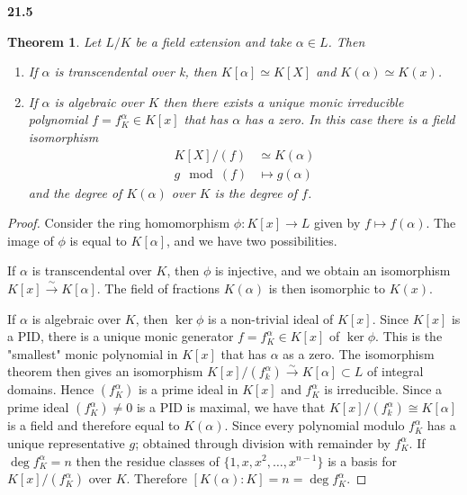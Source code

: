 \documentclass{article}
\theoremstyle{plain}
\newtheorem*{theorem*}{Theorem}
\theoremstyle{remark}
\newenvironment{colbox}[1]
    {\newcommand\colboxcolor{B6D0DE}%
    \begin{lrbox}{\selvestebox}%
    \begin{minipage}{\dimexpr\columnwidth-2\fboxsep\relax}\textbf{#1}}
    {\vspace{0.5em}\end{minipage}\end{lrbox}%
    \begin{center}
    \colorbox[HTML]{\colboxcolor}{\usebox{\selvestebox}}
    \end{center}}
\begin{document}
    \begin{colbox}{21.5}
        \begin{theorem*}
            Let $L/K$ be a field extension and take $\alpha\in L$. Then
            \begin{enumerate}
                \item If $\alpha$ is transcendental over k, then $K[\alpha]\simeq K[X]$ and $K(\alpha)\simeq K(x)$.
                \item If $\alpha$ is algebraic over $K$ then there exists a unique monic irreducible polynomial $f=f_K^\alpha\in K[x]$ that has $\alpha$ has a zero.
                    In this case there is a field isomorphism
                    \begin{align*}
                        K[X]/(f)&\simeq K(\alpha)\\
                        g\mod (f)&\mapsto g(\alpha)
                    \end{align*}
                    and the degree of $K(\alpha)$ over $K$ is the degree of $f$.
            \end{enumerate}
        \end{theorem*}
    \end{colbox}
    \begin{proof}
        Consider the ring homomorphism $\phi:K[x]\to L$ given by $f\mapsto f(\alpha)$.
        The image of $\phi$ is equal to $K[\alpha]$, and we have two possibilities.

        If $\alpha$ is transcendental over $K$, then $\phi$ is injective, and we obtain an isomorphism $K[x]\xrightarrow{\sim}K[\alpha]$.
        The field of fractions $K(\alpha)$ is then isomorphic to $K(x)$.

        If $\alpha$ is algebraic over $K$, then $\ker\phi$ is a non-trivial ideal of $K[x]$.
        Since $K[x]$ is a PID, there is a unique monic generator $f=f_K^\alpha\in K[x]$ of $\ker\phi$.
        This is the "smallest" monic polynomial in $K[x]$ that has $\alpha$ as a zero. 
        The isomorphism theorem then gives an isomorphism $K[x]/(f_k^\alpha)\xrightarrow{\sim}K[\alpha]\subset L$ of integral domains.
        Hence $(f_K^\alpha)$ is a prime ideal in $K[x]$ and $f_K^\alpha$ is irreducible. 
        Since a prime ideal $(f_K^\alpha)\neq 0$ is a PID is maximal, we have that $K[x]/(f_k^\alpha)\cong K[\alpha]$ is a field and therefore equal to $K(\alpha)$.
        Since every polynomial modulo $f_K^\alpha$ has a unique representative $g$; obtained through division with remainder by $f_K^\alpha$. 
        If $\deg f_K^\alpha=n$ then the residue classes of $\{1,x,x^2,\dots, x^{n-1}\}$ is a basis for $K[x]/(f_K^\alpha)$ over $K$. 
        Therefore $[K(\alpha):K]=n=\deg f_K^\alpha$.
    \end{proof}
\end{document}
